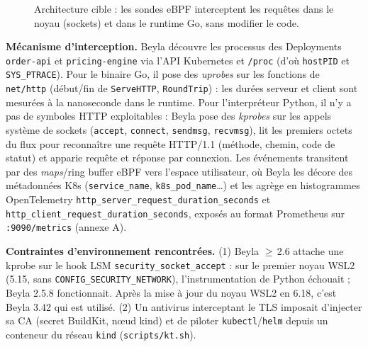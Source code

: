 \documentclass[10pt,a4paper]{article}
\newcommand{\code}[1]{\texttt{\small #1}}
\begin{document}
\begin{figure}[H]
\caption{Architecture cible : les sondes eBPF interceptent les requêtes dans le noyau (sockets) et dans le runtime Go, sans modifier le code.}
\end{figure}

\textbf{Mécanisme d'interception.} Beyla découvre les processus des Deployments \code{order-api} et \code{pricing-engine} via l'API Kubernetes et \code{/proc} (d'où \code{hostPID} et \code{SYS\_PTRACE}). Pour le binaire Go, il pose des \emph{uprobes} sur les fonctions de \code{net/http} (début/fin de \code{ServeHTTP}, \code{RoundTrip}) : les durées serveur et client sont mesurées à la nanoseconde dans le runtime. Pour l'interpréteur Python, il n'y a pas de symboles HTTP exploitables : Beyla pose des \emph{kprobes} sur les appels système de sockets (\code{accept}, \code{connect}, \code{sendmsg}, \code{recvmsg}), lit les premiers octets du flux pour reconnaître une requête HTTP/1.1 (méthode, chemin, code de statut) et apparie requête et réponse par connexion. Les événements transitent par des \emph{maps}/ring buffer eBPF vers l'espace utilisateur, où Beyla les décore des métadonnées K8s (\code{service\_name}, \code{k8s\_pod\_name}…) et les agrège en histogrammes OpenTelemetry \code{http\_server\_request\_duration\_seconds} et \code{http\_client\_request\_duration\_seconds}, exposés au format Prometheus sur \code{:9090/metrics} (annexe A).

\textbf{Contraintes d'environnement rencontrées.} (1) Beyla $\geq$\,2.6 attache une kprobe sur le hook LSM \code{security\_socket\_accept} : sur le premier noyau WSL2 (5.15, sans \code{CONFIG\_SECURITY\_NETWORK}), l'instrumentation de Python échouait ; Beyla 2.5.8 fonctionnait. Après la mise à jour du noyau WSL2 en 6.18, c'est Beyla 3.42 qui est utilisé. (2) Un antivirus interceptant le TLS imposait d'injecter sa CA (secret BuildKit, nœud kind) et de piloter \code{kubectl}/\code{helm} depuis un conteneur du réseau \code{kind} (\code{scripts/kt.sh}).

\end{document}
